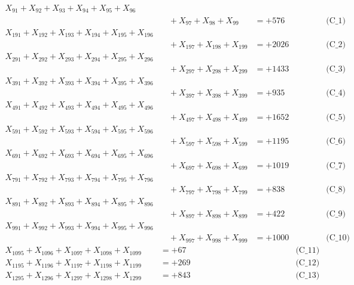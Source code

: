 \documentclass[a4paper,10pt]{article}
\begin{document}
\allowdisplaybreaks
{\small
\begin{align}
X_{91} + X_{92} + X_{93} + X_{94} + X_{95} + X_{96} \\[0.1ex]
&\quad  + X_{97} + X_{98} + X_{99} &= +576 && \text{(C\_1)} \\
X_{191} + X_{192} + X_{193} + X_{194} + X_{195} + X_{196} \\[0.1ex]
&\quad  + X_{197} + X_{198} + X_{199} &= +2026 && \text{(C\_2)} \\
X_{291} + X_{292} + X_{293} + X_{294} + X_{295} + X_{296} \\[0.1ex]
&\quad  + X_{297} + X_{298} + X_{299} &= +1433 && \text{(C\_3)} \\
X_{391} + X_{392} + X_{393} + X_{394} + X_{395} + X_{396} \\[0.1ex]
&\quad  + X_{397} + X_{398} + X_{399} &= +935 && \text{(C\_4)} \\
X_{491} + X_{492} + X_{493} + X_{494} + X_{495} + X_{496} \\[0.1ex]
&\quad  + X_{497} + X_{498} + X_{499} &= +1652 && \text{(C\_5)} \\
\allowbreak
X_{591} + X_{592} + X_{593} + X_{594} + X_{595} + X_{596} \\[0.1ex]
&\quad  + X_{597} + X_{598} + X_{599} &= +1195 && \text{(C\_6)} \\
X_{691} + X_{692} + X_{693} + X_{694} + X_{695} + X_{696} \\[0.1ex]
&\quad  + X_{697} + X_{698} + X_{699} &= +1019 && \text{(C\_7)} \\
X_{791} + X_{792} + X_{793} + X_{794} + X_{795} + X_{796} \\[0.1ex]
&\quad  + X_{797} + X_{798} + X_{799} &= +838 && \text{(C\_8)} \\
X_{891} + X_{892} + X_{893} + X_{894} + X_{895} + X_{896} \\[0.1ex]
&\quad  + X_{897} + X_{898} + X_{899} &= +422 && \text{(C\_9)} \\
X_{991} + X_{992} + X_{993} + X_{994} + X_{995} + X_{996} \\[0.1ex]
&\quad  + X_{997} + X_{998} + X_{999} &= +1000 && \text{(C\_10)} \\
\allowbreak
X_{1095} + X_{1096} + X_{1097} + X_{1098} + X_{1099} &= +67 && \text{(C\_11)} \\
X_{1195} + X_{1196} + X_{1197} + X_{1198} + X_{1199} &= +269 && \text{(C\_12)} \\
X_{1295} + X_{1296} + X_{1297} + X_{1298} + X_{1299} &= +843 && \text{(C\_13)} \\

\end{align}}
\end{document}
